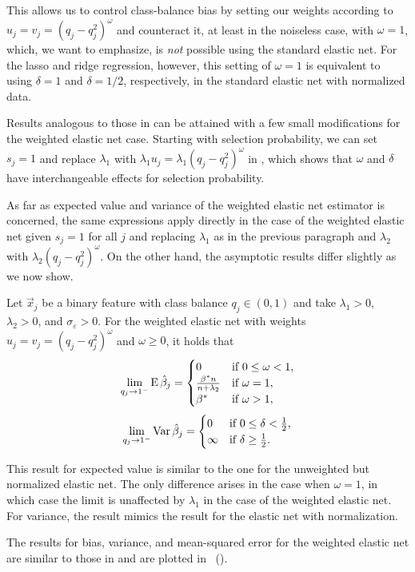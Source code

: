 This allows us to control class-balance bias by setting our weights according to \(u_j =
v_j = (q_j - q_j^2)^{\omega}\) and counteract it, at least in the noiseless case, with
\(\omega = 1\), which, we want to emphasize, is \emph{not} possible using the standard
elastic net. For the lasso and ridge regression, however, this setting of \(\omega=1\) is
equivalent to using \(\delta = 1\) and \(\delta = 1/2\), respectively, in the standard
elastic net with normalized data.

Results analogous to those in  can be attained with a few
small modifications for the weighted elastic net case. Starting with selection probability,
we can set \(s_j = 1\) and replace \(\lambda_1\) with \(\lambda_1 u_j =
\lambda_1(q_j-q_j^2)^\omega\) in , which shows that
\(\omega\) and \(\delta\) have interchangeable effects for selection probability.

As far as expected value and variance of the weighted elastic net estimator is concerned,
the same expressions apply directly in the case of the weighted elastic net given \(s_j =
1\) for all \(j\) and replacing \(\lambda_1\) as in the previous paragraph and
\(\lambda_2\) with \(\lambda_2 (q_j - q_j^2)^\omega\). On the other hand, the asymptotic
results differ slightly as we now show.

\begin{theorem}
  \label{thm:weighted-elasticnet-bias-variance}
  Let \(\vec{x}_j\) be a binary feature with class balance \(q_j \in (0, 1)\) and take
  \(\lambda_1 > 0\), \(\lambda_2 > 0\), and \(\sigma_\varepsilon > 0\). For the
  weighted elastic net with weights \(u_j = v_j = (q_j-q_j^2)^\omega\) and \(\omega \geq 0\), it holds that
  \[
    \lim_{q_j \rightarrow 1^-} \operatorname{E} \hat{\beta}_j =
    \begin{cases}
      0                              & \text{if } 0 \leq \omega < 1, \\
      \frac{\beta^*n}{n + \lambda_2} & \text{if } \omega = 1,        \\
      \beta^*                        & \text{if } \omega > 1,
    \end{cases}
  \]
  \[
    \lim_{q_j \rightarrow 1^-} \operatorname{Var} \hat{\beta}_j =
    \begin{cases}
      0      & \text{if } 0 \leq \delta < \frac{1}{2}, \\
      \infty & \text{if } \delta \geq \frac{1}{2}.
    \end{cases}
  \]
\end{theorem}

This result for expected value is similar to the one for the unweighted but normalized
elastic net. The only difference arises in the case when \(\omega = 1\), in which case the
limit is unaffected by \(\lambda_1\) in the case of the weighted elastic net. For variance,
the result mimics the result for the elastic net with normalization.

The results for bias, variance, and mean-squared error for the weighted elastic net are
similar to those in  and are plotted in
~().
